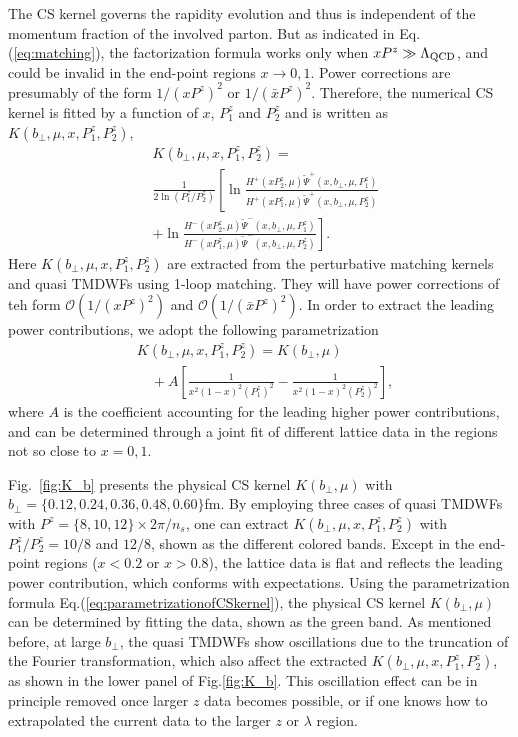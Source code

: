 The CS kernel governs the rapidity evolution and thus is independent of the momentum fraction of the involved parton.  But as indicated in Eq.(\ref{eq:matching}), the factorization formula  works only when $xP^z\gg \Lambda_{\rm QCD}$, and could be invalid  in the end-point regions $x\to0,1$. Power corrections are presumably  of the form $1/\left(xP^z\right)^2$ or $1/\left(\bar{x}P^z\right)^2$. Therefore,  the numerical CS kernel is fitted by a function of $x$, $P_1^z$ and $P_2^z$ and is written as $K(b_{\perp},\mu,x,P^z_1,P^z_2)$,
\begin{align}
&K(b_{\perp},\mu,x,P^z_1,P^z_2) =\nonumber\\
&\frac{1}{2\ln(P_1^z/P_2^z)} \left[\ln\frac{H^{+}(xP_2^z,\mu)\tilde{\Psi}^{+}(x,b_{\perp},\mu,P_1^z)}{H^{+}(xP_1^z,\mu)\tilde{\Psi}^{+}(x,b_{\perp},\mu,P_2^z)}\right.  \nonumber\\
	&+\left.\ln\frac{H^{-}(xP_2^z,\mu)\tilde{\Psi}^{-}(x,b_{\perp},\mu,P_1^z)}{H^{-}(xP_1^z,\mu)\tilde{\Psi}^{-}(x,b_{\perp},\mu,P_2^z)}\right].
\end{align}
Here $K(b_{\perp},\mu,x,P^z_1,P^z_2)$ are extracted from the perturbative matching kernels and quasi TMDWFs using 1-loop matching. They will have power corrections of teh form $\mathcal{O}\left(1/\left(xP^z\right)^2\right)$ and $\mathcal{O}\left(1/\left(\bar{x}P^z\right)^2\right)$. In order to extract the leading power contributions, we adopt  the following parametrization
\begin{align}
&K(b_{\perp},\mu,x,P^z_1,P^z_2) = K(b_{\perp},\mu) \nonumber\\
&\quad+A\left[\frac{1}{x^2(1-x)^2(P^z_1)^2}-\frac{1}{x^2(1-x)^2(P^z_2)^2}\right], \label{eq:parametrizationofCSkernel}
\end{align}
where $A$ is the coefficient accounting for  the leading higher power contributions, and can be determined through a joint fit of different lattice data in the regions not so close to $x=0, 1$. 

Fig.~\ref{fig:K_b} presents the physical CS kernel $K(b_{\perp},\mu)$ with $b_{\perp}=\{0.12,0.24,0.36,0.48,0.60\}$fm. By employing three cases of quasi TMDWFs with $P^z=\{8,10,12\}\times2\pi/n_s$, one can extract $K(b_{\perp},\mu,x,P^z_1,P^z_2)$ with $P_1^z/P_2^z=10/8$ and $12/8$, shown as the different colored bands.  Except in the end-point regions ($x<0.2$ or $x>0.8$), the lattice data is flat and reflects the leading power contribution, which conforms with expectations. Using the parametrization formula Eq.(\ref{eq:parametrizationofCSkernel}), the physical CS kernel $K(b_{\perp},\mu)$ can be determined by fitting the data, shown as the green band. As mentioned before, at large $b_{\perp}$, the quasi TMDWFs   show oscillations due to the  truncation of the Fourier transformation, which also affect the extracted $K(b_{\perp},\mu,x,P^z_1,P^z_2)$, as shown in the lower panel of Fig.\ref{fig:K_b}. This oscillation effect can be in principle removed once larger $z$ data becomes possible, or if one knows how to extrapolated the current data to the larger $z$ or $\lambda$ region. 


